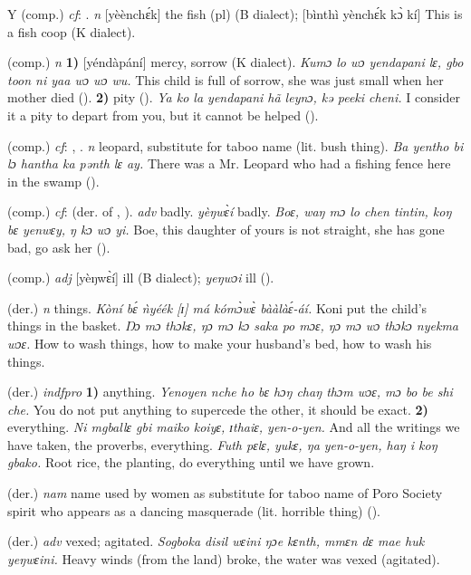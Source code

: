 \begin{letter}{Y}
 (comp.) \textit{cf}: . \textit{n} [yèènchɛ́k] the fish (pl) (B dialect); [bìnthì yènchɛ́k kɔ̀ kí] This is a fish coop (K dialect). 

 (comp.) \textit{n} \textbf{1)} [yéndàpání] mercy, sorrow (K dialect). \textit{Kumɔ lo wɔ yendapani lɛ, gbo toon ni yaa wɔ wɔ wu.} This child is full of sorrow, she was just small when her mother died (\citealt{Pichl1967}). \textbf{2)} pity (\citealt{Pichl1967}). \textit{Ya ko la yendapani hã leynɔ, kə peeki cheni.} I consider it a pity to depart from you, but it cannot be helped (\citealt{Pichl1967}). 

 (comp.) \textit{cf}: , . \textit{n} leopard, substitute for taboo name (lit. bush thing). \textit{Ba yentho bi lɔ hantha ka pənth lɛ ay.} There was a Mr. Leopard who had a fishing fence here in the swamp (\citealt{Pichl1967}).

 (comp.) \textit{cf}:  (der. of , ). \textit{adv} badly. \textit{yèŋwɛ̀í} badly. \textit{Boɛ, waŋ mɔ lo chen tintin, koŋ bɛ yenwɛy, ŋ kɔ wɔ yi.} Boe, this daughter of yours is not straight, she has gone bad, go ask her (\citealt{Pichl1967}).

 (comp.) \textit{adj} [yèŋwɛ̀í] ill (B dialect); \textit{yeŋwɔi} ill (\citealt{Sumner1921}). 

 (der.) \textit{n} things. \textit{Kòní bɛ́ ǹyéék [ɪ] má kómɔ̀wɛ̀ bààlàɛ́-áí.} Koni put the child's things in the basket. \textit{Ŋɔ mɔ thɔkɛ, ŋɔ mɔ kɔ saka po mɔɛ, ŋɔ mɔ wɔ thɔkɔ nyekma wɔɛ.} How to wash things, how to make your husband's bed, how to wash his things.

 (der.) \textit{indfpro} \textbf{1)} anything. \textit{Yenoyen nche ho bɛ hɔŋ chaŋ thɔm wɔɛ, mɔ bo be shi che.} You do not put anything to supercede the other, it should be exact. \textbf{2)} everything. \textit{Ni mgballɛ gbi maiko koiyɛ, ɪthaiɛ, yen-o-yen.} And all the writings we have taken, the proverbs, everything. \textit{Futh pɛlɛ, yukɛ, ŋa yen-o-yen, haŋ i koŋ gbako.} Root rice, the planting, do everything until we have grown.

 (der.) \textit{nam} name used by women as substitute for taboo name of Poro Society spirit who appears as a dancing masquerade (lit. horrible thing) (\citealt{Pichl1967}).

 (der.) \textit{adv} vexed; agitated. \textit{Sogboka disil wɛini ŋɔe kɛnth, mmɛn dɛ mae huk yeŋwɛini.} Heavy winds (from the land) broke, the water was vexed (agitated). 


\end{letter}
